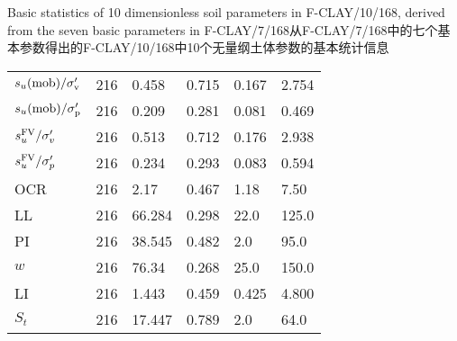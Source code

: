 {\begin{BiliTable}[label=table:5][H]{Basic statistics of 10 dimensionless soil parameters in F-CLAY/10/168, derived from the seven basic parameters in F-CLAY/7/168}{从F-CLAY/7/168中的七个基本参数得出的F-CLAY/10/168中10个无量纲土体参数的基本统计信息}
\begin{tabularx}{\textwidth}{lXXXXX}
            $s_u(\rm{mob})/\sigma_v'$   & 216   & 0.458  & 0.715 & 0.167 & 2.754 \\
            $s_u(\rm{mob})/\sigma_p'$   & 216   & 0.209  & 0.281 & 0.081 & 0.469 \\
            $s_u^{\rm{FV}}/\sigma_v'$   & 216   & 0.513  & 0.712 & 0.176 & 2.938 \\
            $s_u^{\rm{FV}}/\sigma_p'$   & 216   & 0.234  & 0.293 & 0.083 & 0.594 \\
            OCR                         & 216   & 2.17   & 0.467 & 1.18  & 7.50  \\
            LL                          & 216   & 66.284 & 0.298 & 22.0  & 125.0 \\
            PI                          & 216   & 38.545 & 0.482 & 2.0   & 95.0  \\
            $w$                         & 216   & 76.34  & 0.268 & 25.0  & 150.0 \\
            LI                          & 216   & 1.443  & 0.459 & 0.425 & 4.800 \\
            $S_t$                          & 216   & 17.447 & 0.789 & 2.0   & 64.0  \\
            \bottomrule
        \end{tabularx}
    \end{BiliTable}
}